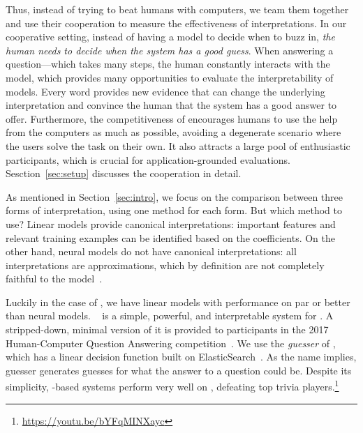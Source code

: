 Thus, instead of trying to beat humans with computers, we team
them together and use their cooperation to
measure the effectiveness of interpretations.  In our cooperative
setting, instead of having a model to decide when to buzz in,
\emph{the human needs to decide when the system has a good guess}.
When answering a \qb{} question---which takes many steps, the human
constantly interacts with the model, which provides many opportunities
to evaluate the interpretability of models.  Every word provides new
evidence that can change the underlying interpretation and convince
the human that the system has a good answer to offer.
Furthermore, the competitiveness of
\qb{} encourages humans to use the help from the computers as much as
possible, avoiding a degenerate scenario where the users solve the
task on their own. It also attracts a large pool of enthusiastic
participants, which is crucial for application-grounded evaluations.
Sesction~\ref{sec:setup} discusses the cooperation in detail.


As mentioned in Section~\ref{sec:intro}, we focus on the comparison
between three forms of interpretation, using one method for each form.
But which method to use?  Linear models provide canonical
interpretations: important features and relevant training examples can
be identified based on the coefficients. On the other hand, neural
models do not have
canonical interpretations: 
all interpretations are approximations, which by definition are not
completely faithful to the model~\cite{rudin2018please}.

Luckily in the case of \qb{}, we have linear models with
performance on par or better than neural models.
~\cite{iyyer2014ann} is a simple, powerful, and
interpretable system for \qb{}. A stripped-down, minimal version of it
is provided to participants in the  2017 Human-Computer
Question Answering competition~\cite{nips2018qbcomp}.  We use the
\emph{guesser} of , which has a linear decision function
built on ElasticSearch~\cite[]{gormley2015es}.  As the name
implies, guesser generates guesses for what the answer to a question
could be.  Despite its simplicity, -based
systems perform very well on \qb{}, defeating top trivia
players.\footnote{\url{https://youtu.be/bYFqMINXayc}}

